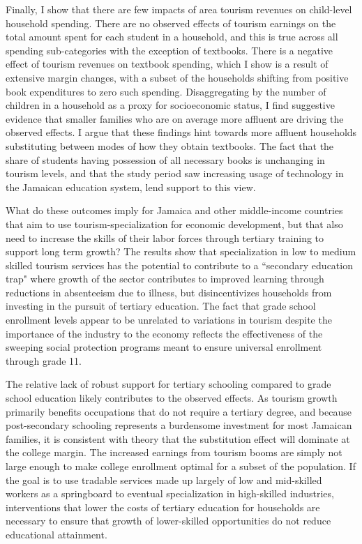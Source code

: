 \documentclass[12pt]{article}
\begin{document}
	Finally, I show that there are few impacts of area tourism revenues on child-level household spending. There are no observed effects of tourism earnings on the total amount spent for each student in a household, and this is true across all spending sub-categories with the exception of textbooks. There is a negative effect of tourism revenues on textbook spending, which I show is a result of extensive margin changes, with a subset of the households shifting from positive book expenditures to zero such spending. Disaggregating by the number of children in a household as a proxy for socioeconomic status, I find suggestive evidence that smaller families who are on average more affluent are driving the observed effects. I argue that these findings hint towards more affluent households substituting between modes of how they obtain textbooks. The fact that the share of students having possession of all necessary books is unchanging in tourism levels, and that the study period saw increasing usage of technology in the Jamaican education system, lend support to this view. 
	
		What do these outcomes imply for Jamaica and other middle-income countries that aim to use tourism-specialization for economic development, but that also need to increase the skills of their labor forces through tertiary training to support long term growth? The results show that specialization in low to medium skilled tourism services has the potential to contribute to a ``secondary education trap" where growth of the sector contributes to improved learning through reductions in absenteeism due to illness, but disincentivizes households from investing in the pursuit of tertiary education. The fact that grade school enrollment levels appear to be unrelated to variations in tourism despite the importance of the industry to the economy reflects the effectiveness of the sweeping social protection programs meant to ensure universal enrollment through grade 11\parencite{caribbean_policy_research_institute_jamaica_2025}. 
		
		The relative lack of robust support for tertiary schooling compared to grade school education\parencite{ the_world_bank_public_2021} likely contributes to the observed effects. As tourism growth primarily benefits occupations that do not require a tertiary degree, and because post-secondary schooling represents a burdensome investment for most Jamaican families, it is consistent with theory that the substitution effect will dominate at the college margin. The increased earnings from tourism booms are simply not large enough to make college enrollment optimal for a subset of the population. If the goal is to use tradable services made up largely of low and mid-skilled workers as a springboard to eventual specialization in high-skilled industries, interventions that lower the costs of tertiary education for households are necessary to ensure that growth of lower-skilled opportunities do not reduce educational attainment. 
		
\end{document}
